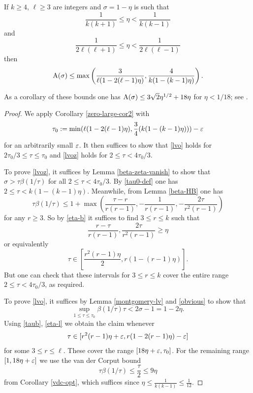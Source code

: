 \begin{theorem}\label{pintz-density}\cite[Theorem 1]{pintz_density_2023}  If $k \geq 4$, $\ell \geq 3$ are integers and $\sigma = 1-\eta$ is such that
\begin{equation}\label{eta-b}
    \frac{1}{k(k+1)} \leq \eta < \frac{1}{k(k-1)}
\end{equation}
and
\begin{equation}\label{eta-l}
 \frac{1}{2\ell(\ell+1)} \leq \eta < \frac{1}{2\ell(\ell-1)}
\end{equation}
then
$$ \mathrm{A}(\sigma) \leq \max\left( \frac{3}{\ell(1-2(\ell-1)\eta)}, \frac{4}{k(1-(k-1)\eta)}\right).$$
\end{theorem}
\literature
{}

As a corollary of these bounds one has $\mathrm{A}(\sigma) \leq 3\sqrt{2} \eta^{1/2} + 18 \eta$ for $\eta < 1/18$; see \cite[Theorem 2']{pintz_density_2023}.

\begin{proof} We apply Corollary \ref{zero-large-cor2} with
\begin{equation}\label{tau0-def}
\tau_0 := \min( \ell (1 - 2(\ell-1) \eta), \frac{3}{4} (k(1-(k-1)\eta)) ) - \varepsilon
\end{equation}
for an arbitrarily small $\varepsilon$.
It then suffices to show that \eqref{lvo} holds for $2\tau_0/3 \leq \tau \leq \tau_0$ and \eqref{lvoz} holds for $2 \leq \tau < 4\tau_0/3$.

To prove \eqref{lvoz}, it suffices by Lemma \ref{beta-zeta-vanish} to show that $\sigma > \tau \beta(1/\tau)$ for all $2 \leq \tau < 4 \tau_0/3$.  By \eqref{tau0-def} one has $2 \leq \tau < k(1-(k-1)\eta)$.  Meanwhile, from Lemma \ref{beta-HB} one has
\begin{equation}\label{taub}
\tau \beta(1/\tau) \leq 1 + \max\left( \frac{\tau-r}{r(r-1)}, -\frac{1}{r(r-1)}, - \frac{2\tau}{r^2(r-1)}\right)
\end{equation}
for any $r \geq 3$.  So by \eqref{eta-b} it suffices to find $3 \leq r \leq k$ such that
$$ \frac{r-\tau}{r(r-1)}, \frac{2\tau}{r^2(r-1)} \geq \eta$$
or equivalently
$$ \tau \in [\frac{r^2(r-1)\eta}{2}, r(1-(r-1)\eta)].$$
But one can check that these intervals for $3 \leq r \leq k$ cover the entire range $2 \leq \tau < 4\tau_0/3$, as required.

To prove \eqref{lvo}, it suffices by Lemma \ref{montgomery-lv} and \eqref{obvious} to show that
$$ \sup_{1 \leq \tau \leq \tau_0} \beta(1/\tau) \tau < 2\sigma - 1 = 1 - 2 \eta.$$
Using \eqref{taub}, \eqref{eta-l} we obtain the claim whenever
$$ \tau \in [r^2(r-1)\eta+\varepsilon, r(1-2(r-1)\eta)-\varepsilon]$$
for some $3 \leq r \leq \ell$.  These cover the range $[18\eta+\varepsilon, \tau_0]$.  For the remaining range $[1, 18\eta+\varepsilon]$ we use the van der Corput bound
$$ \tau \beta(1/\tau) \leq \frac{\tau}{2} \leq 9 \eta$$
from Corollary \ref{vdc-opt}, which suffices since $\eta \leq \frac{1}{k(k-1)} \leq \frac{1}{12}$.
\end{proof}

